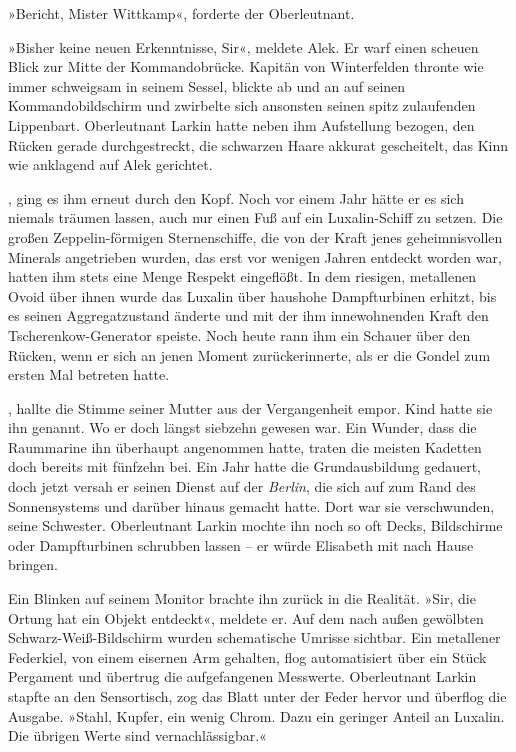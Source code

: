 »Bericht, Mister Wittkamp«, forderte der Oberleutnant.

»Bisher keine neuen Erkenntnisse, Sir«, meldete Alek. Er warf einen
scheuen Blick zur Mitte der Kommandobrücke. Kapitän von
Winterfelden thronte wie immer schweigsam in seinem Sessel, blickte
ab und an auf seinen Kommandobildschirm und zwirbelte sich
ansonsten seinen spitz zulaufenden Lippenbart. Oberleutnant Larkin
hatte neben ihm Aufstellung bezogen, den Rücken gerade
durchgestreckt, die schwarzen Haare akkurat gescheitelt, das Kinn
wie anklagend auf Alek gerichtet.

, ging es ihm erneut durch den Kopf. Noch vor einem Jahr
hätte er es sich niemals träumen lassen, auch nur einen Fuß auf ein
Luxalin-Schiff zu setzen. Die großen Zeppelin-förmigen
Sternenschiffe, die von der Kraft jenes geheimnisvollen Minerals
angetrieben wurden, das erst vor wenigen Jahren entdeckt worden
war, hatten ihm stets eine Menge Respekt eingeflößt. In dem
riesigen, metallenen Ovoid über ihnen wurde das Luxalin über
haushohe Dampfturbinen erhitzt, bis es seinen Aggregatzustand
änderte und mit der ihm innewohnenden Kraft den
Tscherenkow-Generator speiste. Noch heute rann ihm ein Schauer über
den Rücken, wenn er sich an jenen Moment zurückerinnerte, als er
die Gondel zum ersten Mal betreten hatte.

, hallte die Stimme seiner Mutter aus der
Vergangenheit empor. Kind hatte sie ihn genannt. Wo er doch längst
siebzehn gewesen war. Ein Wunder, dass die Raummarine ihn überhaupt
angenommen hatte, traten die meisten Kadetten doch bereits mit
fünfzehn bei. Ein Jahr hatte die Grundausbildung gedauert, doch
jetzt versah er seinen Dienst auf der \textit{Berlin}, die sich auf zum Rand
des Sonnensystems und darüber hinaus gemacht hatte. Dort war sie
verschwunden, seine Schwester. Oberleutnant Larkin mochte ihn noch
so oft Decks, Bildschirme oder Dampfturbinen schrubben lassen – er
würde Elisabeth mit nach Hause bringen.

Ein Blinken auf seinem Monitor brachte ihn zurück in die Realität.
»Sir, die Ortung hat ein Objekt entdeckt«, meldete er. Auf dem nach
außen gewölbten Schwarz-Weiß-Bildschirm wurden schematische Umrisse
sichtbar. Ein metallener Federkiel, von einem eisernen Arm
gehalten, flog automatisiert über ein Stück Pergament und übertrug
die aufgefangenen Messwerte. Oberleutnant Larkin stapfte an den
Sensortisch, zog das Blatt unter der Feder hervor und überflog die
Ausgabe. »Stahl, Kupfer, ein wenig Chrom. Dazu ein geringer Anteil
an Luxalin. Die übrigen Werte sind vernachlässigbar.«

